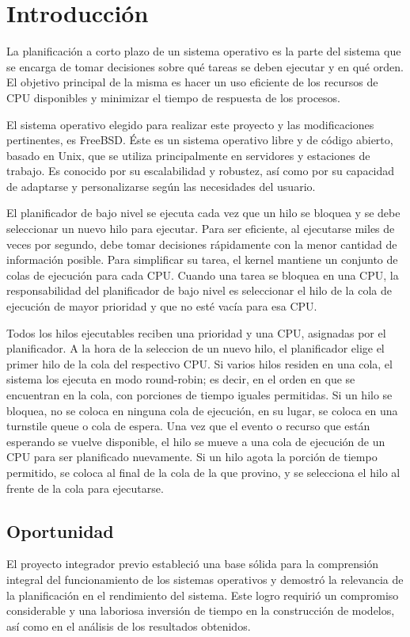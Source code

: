 \section{Introducción}
La planificación a corto plazo de un sistema operativo es la parte del sistema que se encarga de tomar decisiones sobre qué tareas se deben ejecutar y en qué orden. El objetivo principal de la misma es hacer un uso eficiente de los recursos de CPU disponibles y minimizar el tiempo de respuesta de los procesos.\par

El sistema operativo elegido para realizar este proyecto y las modificaciones pertinentes, es FreeBSD. Éste es un sistema operativo libre y de código abierto, basado en Unix, que se utiliza principalmente en servidores y estaciones de trabajo. Es conocido por su escalabilidad y robustez, así como por su capacidad de adaptarse y personalizarse según las necesidades del usuario.\par


El planificador de bajo nivel se ejecuta cada vez que un hilo se bloquea y se debe seleccionar un nuevo hilo para ejecutar. Para ser eficiente, al ejecutarse miles de veces por segundo, debe tomar decisiones rápidamente con la menor cantidad de información posible. Para simplificar su tarea, el kernel mantiene un conjunto de colas de ejecución para cada CPU. Cuando una tarea se bloquea en una CPU, la responsabilidad del planificador de bajo nivel es seleccionar el hilo de la cola de ejecución de mayor prioridad y que no esté vacía para esa CPU.\par

Todos los hilos ejecutables reciben una prioridad y una CPU, asignadas por el planificador. A la hora de la seleccion de un nuevo hilo, el planificador elige el primer hilo de la cola del respectivo CPU. Si varios hilos residen en una cola, el sistema los ejecuta en modo round-robin; es decir, en el orden en que se encuentran en la cola, con porciones de tiempo iguales permitidas. Si un hilo se bloquea, no se coloca en ninguna cola de ejecución, en su lugar, se coloca en una turnstile queue o cola de espera. Una vez que el evento o recurso que están esperando se vuelve disponible, el hilo se mueve a una cola de ejecución de un CPU para ser planificado nuevamente. Si un hilo agota la porción de tiempo permitido, se coloca al final de la cola de la que provino, y se selecciona el hilo al frente de la cola para ejecutarse.\par

\subsection{Oportunidad}
El proyecto integrador previo estableció una base sólida para la comprensión integral del funcionamiento de los sistemas operativos y demostró la relevancia de la planificación en el rendimiento del sistema. Este logro requirió un compromiso considerable y una laboriosa inversión de tiempo en la construcción de modelos, así como en el análisis de los resultados obtenidos.\par

